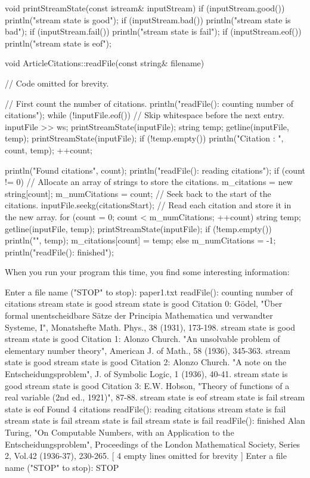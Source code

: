 \begin{cpp}
void printStreamState(const istream& inputStream)
{
    if (inputStream.good()) { println("stream state is good"); }
    if (inputStream.bad()) { println("stream state is bad"); }
    if (inputStream.fail()) { println("stream state is fail"); }
    if (inputStream.eof()) { println("stream state is eof"); }
}

void ArticleCitations::readFile(const string& filename)
{
    // Code omitted for brevity.

    // First count the number of citations.
    println("readFile(): counting number of citations");
    while (!inputFile.eof()) {
        // Skip whitespace before the next entry.
        inputFile >> ws;
        printStreamState(inputFile);
        string temp;
        getline(inputFile, temp);
        printStreamState(inputFile);
        if (!temp.empty()) {
            println("Citation {}: {}", count, temp);
            ++count;
        }
    }

    println("Found {} citations", count);
    println("readFile(): reading citations");
    if (count != 0) {
        // Allocate an array of strings to store the citations.
        m_citations = new string[count];
        m_numCitations = count;
        // Seek back to the start of the citations.
        inputFile.seekg(citationsStart);
        // Read each citation and store it in the new array.
        for (count = 0; count < m_numCitations; ++count) {
            string temp;
            getline(inputFile, temp);
            printStreamState(inputFile);
            if (!temp.empty()) {
                println("{}", temp);
                m_citations[count] = temp;
            }
        }
    } else {
        m_numCitations = -1;
    }
    println("readFile(): finished");
}
\end{cpp}

When you run your program this time, you find some interesting information:

\begin{shell}
Enter a file name ("STOP" to stop): paper1.txt
readFile(): counting number of citations
stream state is good
stream state is good
Citation 0: Gödel, "Über formal unentscheidbare Sätze der Principia Mathematica und
verwandter Systeme, I", Monatshefte Math. Phys., 38 (1931), 173-198.
stream state is good
stream state is good
Citation 1: Alonzo Church. "An unsolvable problem of elementary number theory",
American J. of Math., 58 (1936), 345-363.
stream state is good
stream state is good
Citation 2: Alonzo Church. "A note on the Entscheidungsproblem", J. of Symbolic
Logic, 1 (1936), 40-41.
stream state is good
stream state is good
Citation 3: E.W. Hobson, "Theory of functions of a real variable (2nd ed.,
1921)", 87-88.
stream state is eof
stream state is fail
stream state is eof
Found 4 citations
readFile(): reading citations
stream state is fail
stream state is fail
stream state is fail
stream state is fail
readFile(): finished
Alan Turing, "On Computable Numbers, with an Application to the
Entscheidungsproblem", Proceedings of the London Mathematical Society, Series 2,
Vol.42 (1936-37), 230-265.
[ 4 empty lines omitted for brevity ]
Enter a file name ("STOP" to stop): STOP
\end{shell}


